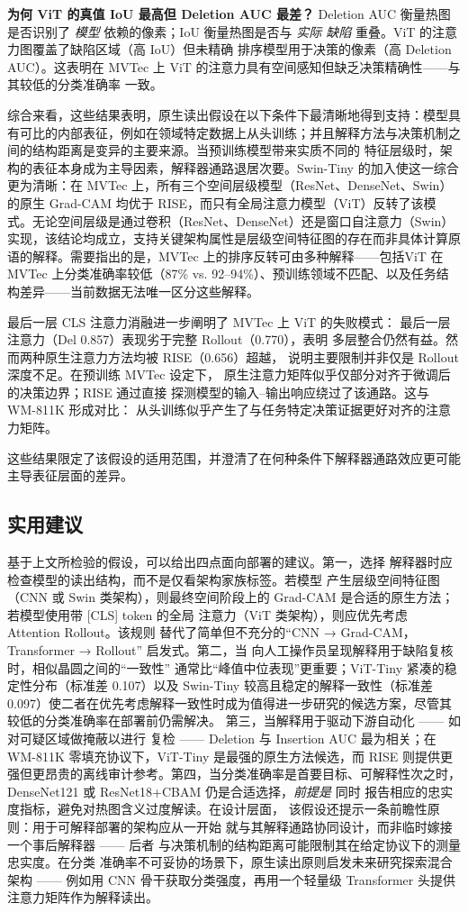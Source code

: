 \documentclass[11pt,a4paper]{article}
\begin{document}
\textbf{为何 ViT 的真值 IoU 最高但 Deletion AUC 最差？} Deletion AUC 衡量热图是否识别了 \emph{模型} 依赖的像素；IoU 衡量热图是否与 \emph{实际 缺陷} 重叠。ViT 的注意力图覆盖了缺陷区域（高 IoU）但未精确 排序模型用于决策的像素（高 Deletion AUC）。这表明在 MVTec 上 ViT 的注意力具有空间感知但缺乏决策精确性——与其较低的分类准确率 一致。

综合来看，这些结果表明，原生读出假设在以下条件下最清晰地得到支持：模型具有可比的内部表征，例如在领域特定数据上从头训练；并且解释方法与决策机制之间的结构距离是变异的主要来源。当预训练模型带来实质不同的 特征层级时，架构的表征本身成为主导因素，解释器通路退居次要。Swin-Tiny 的加入使这一综合更为清晰：在 MVTec 上，所有三个空间层级模型（ResNet、DenseNet、Swin）的原生 Grad-CAM 均优于 RISE，而只有全局注意力模型（ViT）反转了该模式。无论空间层级是通过卷积（ResNet、DenseNet）还是窗口自注意力（Swin）实现，该结论均成立，支持关键架构属性是层级空间特征图的存在而非具体计算原语的解释。需要指出的是，MVTec 上的排序反转可由多种解释——包括ViT 在 MVTec 上分类准确率较低（87\% vs. 92--94\%）、预训练领域不匹配、以及任务结构差异——当前数据无法唯一区分这些解释。

最后一层 CLS 注意力消融进一步阐明了 MVTec 上 ViT 的失败模式： 最后一层注意力（Del 0.857）表现劣于完整 Rollout（0.770），表明 多层整合仍然有益。然而两种原生注意力方法均被 RISE（0.656）超越， 说明主要限制并非仅是 Rollout 深度不足。在预训练 MVTec 设定下， 原生注意力矩阵似乎仅部分对齐于微调后的决策边界；RISE 通过直接 探测模型的输入–输出响应绕过了该通路。这与 WM-811K 形成对比： 从头训练似乎产生了与任务特定决策证据更好对齐的注意力矩阵。

这些结果限定了该假设的适用范围，并澄清了在何种条件下解释器通路效应更可能主导表征层面的差异。

\subsection{实用建议}

基于上文所检验的假设，可以给出四点面向部署的建议。第一，选择 解释器时应检查模型的读出结构，而不是仅看架构家族标签。若模型 产生层级空间特征图（CNN 或 Swin 类架构），则最终空间阶段上的 Grad-CAM 是合适的原生方法；若模型使用带 [CLS] token 的全局 注意力（ViT 类架构），则应优先考虑 Attention Rollout。该规则 替代了简单但不充分的“CNN → Grad-CAM，Transformer → Rollout” 启发式。第二，当 向人工操作员呈现解释用于缺陷复核时，相似晶圆之间的“一致性” 通常比“峰值中位表现”更重要；ViT-Tiny 紧凑的稳定性分布（标准差 0.107）以及 Swin-Tiny 较高且稳定的解释一致性（标准差 0.097）使二者在优先考虑解释一致性时成为值得进一步研究的候选方案，尽管其较低的分类准确率在部署前仍需解决。 第三，当解释用于驱动下游自动化 —— 如对可疑区域做掩蔽以进行 复检 —— Deletion 与 Insertion AUC 最为相关；在 WM-811K 零填充协议下，ViT-Tiny 是最强的原生方法候选，而 RISE 则提供更强但更昂贵的离线审计参考。第四，当分类准确率是首要目标、可解释性次之时， DenseNet121 或 ResNet18+CBAM 仍是合适选择，\emph{前提是} 同时 报告相应的忠实度指标，避免对热图含义过度解读。在设计层面， 该假设还提示一条前瞻性原则：用于可解释部署的架构应从一开始 就与其解释通路协同设计，而非临时嫁接一个事后解释器 —— 后者 与决策机制的结构距离可能限制其在给定协议下的测量忠实度。在分类 准确率不可妥协的场景下，原生读出原则启发未来研究探索混合 架构 —— 例如用 CNN 骨干获取分类强度，再用一个轻量级 Transformer 头提供注意力矩阵作为解释读出。
\end{document}
